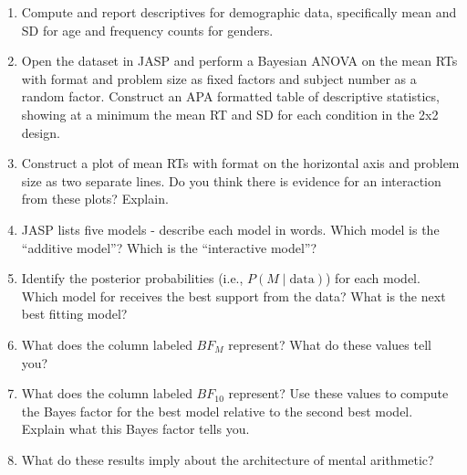 \documentclass[11pt]{article}
\begin{document}
\begin{enumerate}

\item Compute and report descriptives for demographic data, specifically mean and SD for age and frequency counts for genders.
  
\item Open the dataset in JASP and perform a Bayesian ANOVA on the mean RTs with format and problem size as fixed factors and subject number as a random factor. Construct an APA formatted table of descriptive statistics, showing at a minimum the mean RT and SD for each condition in the 2x2 design.

\item Construct a plot of mean RTs with format on the horizontal axis and problem size as two separate lines.  Do you think there is evidence for an interaction from these plots?  Explain.

\item JASP lists five models - describe each model in words.  Which model is the ``additive model''?  Which is the ``interactive model''?

\item Identify the posterior probabilities (i.e., $P(M\mid \text{data})$) for each model. Which model for receives the best support from the data?  What is the next best fitting model?

\item What does the column labeled $BF_M$ represent? What do these values tell you?
  
\item What does the column labeled $BF_{10}$ represent?  Use these values to compute the Bayes factor for the best model relative to the second best model. Explain what this Bayes factor tells you.

\item What do these results imply about the architecture of mental arithmetic?  
\end{enumerate}
\end{document}
